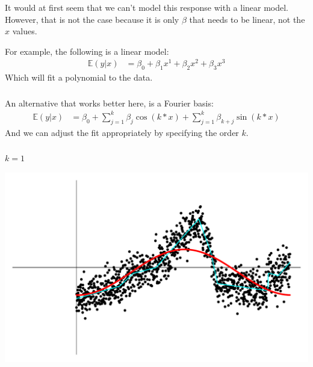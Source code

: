 \begin{frame}[fragile] \frametitle{}

It would at first seem that we can't model this response with a linear
model. However, that is not the case because it is only $\beta$ that needs to be
linear, not the $x$ values. \pause

For example, the following is a linear model:
\begin{align*}
\mathbb{E} (y | x) &= \beta_0 + \beta_1 x^1 + \beta_2 x^2 + \beta_3 x^3
\end{align*}
Which will fit a polynomial to the data.

\end{frame}

\begin{frame}[fragile] \frametitle{}

An alternative that works better here, is a Fourier basis:
\begin{align*}
\mathbb{E} (y | x) &= \beta_0 + \sum_{j=1}^{k} \beta_j \cos (k * x) + \sum_{j=1}^k \beta_{k+j} \sin (k * x)
\end{align*}
And we can adjust the fit appropriately by specifying the
order $k$.

\end{frame}


\begin{frame}[fragile] \frametitle{}

$k=1$

\includegraphics[width=\linewidth]{img/fig06.pdf}

\end{frame}


